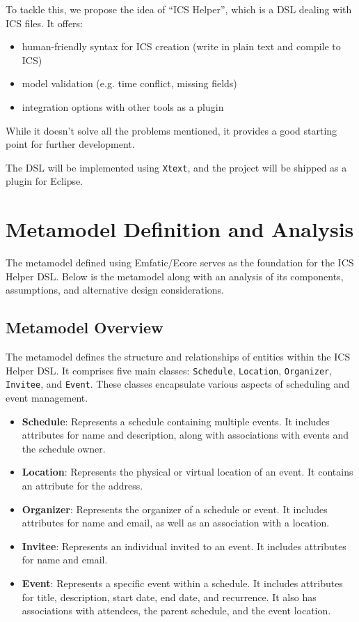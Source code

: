\documentclass[12pt, letterpaper, twoside]{article}
\begin{document}
To tackle this, we propose the idea of ``ICS Helper'', which is a DSL dealing with ICS files. It offers:
    \begin{itemize}
        \item human-friendly syntax for ICS creation (write in plain text and compile to ICS)
        \item model validation (e.g. time conflict, missing fields)
        \item integration options with other tools as a plugin
    \end{itemize}

While it doesn't solve all the problems mentioned, it provides a good starting point for further development.

The DSL will be implemented using \texttt{Xtext}, and the project will be shipped as a plugin for Eclipse.
\newpage
\section{Metamodel Definition and Analysis}

The metamodel defined using Emfatic/Ecore serves as the foundation for the ICS Helper DSL. Below is the metamodel along with an analysis of its components, assumptions, and alternative design considerations.

\subsection{Metamodel Overview}

The metamodel defines the structure and relationships of entities within the ICS Helper DSL. It comprises five main classes: \texttt{Schedule}, \texttt{Location}, \texttt{Organizer}, \texttt{Invitee}, and \texttt{Event}. These classes encapsulate various aspects of scheduling and event management.

\begin{itemize}
    \item \textbf{Schedule}: Represents a schedule containing multiple events. It includes attributes for name and description, along with associations with events and the schedule owner.
    
    \item \textbf{Location}: Represents the physical or virtual location of an event. It contains an attribute for the address.
    
    \item \textbf{Organizer}: Represents the organizer of a schedule or event. It includes attributes for name and email, as well as an association with a location.
    
    \item \textbf{Invitee}: Represents an individual invited to an event. It includes attributes for name and email.
    
    \item \textbf{Event}: Represents a specific event within a schedule. It includes attributes for title, description, start date, end date, and recurrence. It also has associations with attendees, the parent schedule, and the event location.
\end{itemize}
\end{document}
